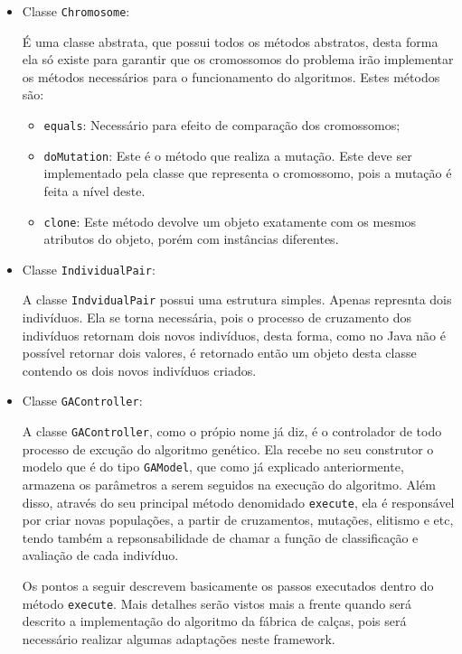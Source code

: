 \begin{itemize}
	\item Classe \texttt{Chromosome}:
	\par É uma classe abstrata, que possui todos os métodos abstratos, desta forma
	ela só existe para garantir que os cromossomos do problema irão implementar os
	métodos necessários para o funcionamento do algoritmos. Estes métodos são:
	
	\begin{itemize}
	  
	  \item \texttt{equals}: Necessário para efeito de comparação dos cromossomos;
	  
	  \item \texttt{doMutation}: Este é o método que realiza a mutação. Este deve
	  ser implementado pela classe que representa o cromossomo, pois a
	  mutação é feita a nível deste.
	  
	  \item \texttt{clone}: Este método devolve um objeto exatamente com os mesmos
	  atributos do objeto, porém com instâncias diferentes.
	  
	\end{itemize}
	
	
	\item Classe \texttt{IndividualPair}:
	\par A classe \texttt{IndvidualPair} possui uma estrutura simples. Apenas
	represnta dois indivíduos. Ela se torna necessária, pois o processo de
	cruzamento dos indivíduos retornam dois novos indivíduos, desta forma, como 
	no Java não é possível retornar dois valores, é retornado então um objeto desta
	classe contendo os dois novos indivíduos criados. 
	
	
	\item Classe \texttt{GAController}:
	\par A classe \texttt{GAController}, como o própio nome já diz, é o
	controlador de todo processo de excução do algoritmo genético.
	Ela recebe no seu construtor o modelo que é do tipo \texttt{GAModel}, que como
	já explicado anteriormente, armazena os parâmetros a serem seguidos na
	execução do algoritmo. Além disso, através do seu principal método
	denomidado \texttt{execute}, ela é responsável por criar novas populações, a
	partir de cruzamentos, mutações, elitismo e etc, tendo também a
	repsonsabilidade de chamar a função de classificação e avaliação de cada indivíduo.
	
	\par Os pontos a seguir descrevem basicamente os passos executados dentro do
	método \texttt{execute}. Mais detalhes serão vistos mais a frente quando será
	descrito a implementação do algoritmo da fábrica de calças, pois será necessário 
	realizar algumas adaptações neste framework.
	

\end{itemize}
